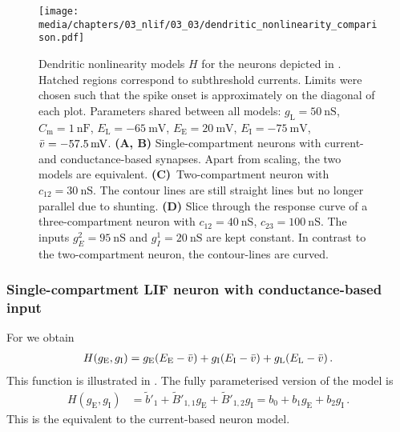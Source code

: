 \begin{figure}
	\texttt{[image: media/chapters/03\_nlif/03\_03/dendritic\_nonlinearity\_comparison.pdf]}%
	{\label{fig:dendritic_nonlinearity_comparison_a}}%
	{\label{fig:dendritic_nonlinearity_comparison_b}}%
	{\label{fig:dendritic_nonlinearity_comparison_c}}%
	{\label{fig:dendritic_nonlinearity_comparison_d}}%
	\caption[Dendritic nonlinearity models $H$ for different $n$-LIF neurons]{Dendritic nonlinearity models $H$ for the \nlif neurons depicted in . Hatched regions correspond to subthreshold currents. Limits were chosen such that the spike onset is approximately on the diagonal of each plot.
	Parameters shared between all models: $g_\mathrm{L} = \SI{50}{\nano\siemens}$, $C_\mathrm{m} = \SI{1}{\nano\farad}$, $E_\mathrm{L} = \SI{-65}{\milli\volt}$, $E_\mathrm{E} = \SI{20}{\milli\volt}$, $E_\mathrm{I} = \SI{-75}{\milli\volt}$, ${{\bar v}} = \SI{-57.5}{\milli\volt}$.
	\textbf{(A, B)} Single-compartment neurons with current- and conductance-based synapses. Apart from scaling, the two models are equivalent.
	\textbf{(C)}~Two-compartment neuron with $c_\mathrm{12} = \SI{30}{\nano\siemens}$. The contour lines are still straight lines but no longer parallel due to shunting.
	\textbf{(D)} Slice through the response curve of a three-compartment \LIF neuron with $c_\mathrm{12} = \SI{40}{\nano\siemens}$, $c_\mathrm{23} = \SI{100}{\nano\siemens}$. The inputs $g_E^2 = \SI{95}{\nano\siemens}$ and $g_I^1 = \SI{20}{\nano\siemens}$ are kept constant. In contrast to the two-compartment neuron, the contour-lines are curved.
	}
\end{figure}


\subsubsection{Single-compartment LIF neuron with conductance-based input}
For  we obtain
\begin{align*}
	H(g_\mathrm{E}, g_\mathrm{I}) = g_\mathrm{E} (E_\mathrm{E} - {{\bar v}}) + g_\mathrm{I} (E_\mathrm{I} - {{\bar v}}) + g_\mathrm{L}(E_\mathrm{L} - {{\bar v}}) \,.
\end{align*}
This function is illustrated in .
The fully parameterised version of the model is
\begin{align*}
	H(g_\mathrm{E}, g_\mathrm{I}) &= \tilde b'_1 + \tilde B'_{1, 1} g_\mathrm{E} + \tilde B'_{1, 2} g_\mathrm{I} = b_0 + b_1 g_\mathrm{E} + b_2 g_\mathrm{I} \,.
\end{align*}
This is the equivalent to the current-based neuron model.

